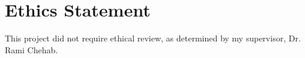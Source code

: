 \documentclass[ oneside,%
                    author={Joshua Felmeden},
                    degree={MEng},
                     title={Sentiment Analysis of Financial Headlines Based on Realised Stock Returns},
                  subtitle={Research}]{dissertation}
\begin{document}





\makedecl





\tableofcontents
\listoffigures
\listoftables




\chapter*{Ethics Statement}

This project did not require ethical review, as determined by my supervisor, Dr. Rami Chehab.



\end{document}
